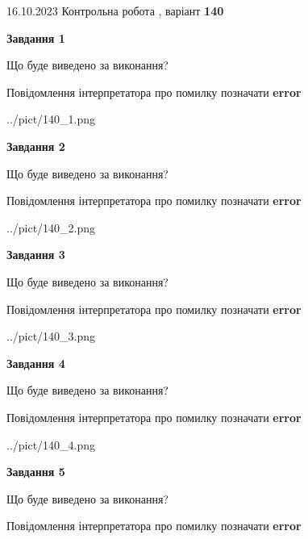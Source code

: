 \documentclass[12pt, ukrainian]{article}
\begin{document}
{\Large{16.10.2023 Контрольна робота , варіант  \No \textbf { 140 }\par}}
{
\begin {large}
{\begin {center}\textbf{Завдання 1}\end {center}}\par
Що буде виведено за виконання? \par
Повідомлення інтерпретатора про помилку позначати \textbf{error}

\begin{center}
	{../pict/140_1.png}
\end{center}
\newpage

{\begin {center}\textbf{Завдання 2}\end {center}}\par
Що буде виведено за виконання? \par
Повідомлення інтерпретатора про помилку позначати \textbf{error}

\begin{center}
	{../pict/140_2.png}
\end{center}
\newpage

{\begin {center}\textbf{Завдання 3}\end {center}}\par
Що буде виведено за виконання? \par
Повідомлення інтерпретатора про помилку позначати \textbf{error}

\begin{center}
	{../pict/140_3.png}
\end{center}
\newpage

{\begin {center}\textbf{Завдання 4}\end {center}}\par
Що буде виведено за виконання? \par
Повідомлення інтерпретатора про помилку позначати \textbf{error}

\begin{center}
	{../pict/140_4.png}
\end{center}
\newpage

{\begin {center}\textbf{Завдання 5}\end {center}}\par
Що буде виведено за виконання? \par
Повідомлення інтерпретатора про помилку позначати \textbf{error}


\end{large}}
\end{document}
